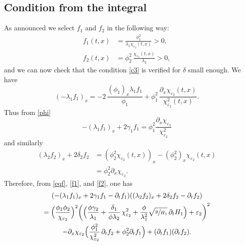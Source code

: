 \documentclass[JEP,XML,SOM,Unicode]{cedram}
\theoremstyle{definition}
\begin{document}
\subsection{Condition from the integral}
{As announced we} select $f_{1}$ and $f_{2}$ in the following way:
\begin{equation}
\begin{split}
f_{1}(t,x)&=\frac{\phi^{2}_{1}}{\lambda_{1}\chi_{\varepsilon_{2}}(t,x)}>0,\\
f_{2}(t,x)&=\phi_{2}^{2}\,\frac{\chi_{\varepsilon_{2}}(t,x)}{\lambda_{2}}>0,
\label{deff1f2}
\end{split}
\end{equation}
and we can now check that the condition \eqref{c3} is verified for $\delta$ small enough. {We have}
\begin{equation*}
(-\lambda_{1}f_{1})_{x}=-2\,\frac{(\phi_{1})_{x}\lambda_{1}f_{1}}{\phi_{1}}+\phi_{1}^{2}\,\frac{\partial_{x}\chi_{\varepsilon_{2}}(t,x)}{\chi_{\varepsilon_{2}}^{2}(t,x)}.
\end{equation*}
Thus from \eqref{phi}
\begin{equation}
-(\lambda_{1}f_{1})_{x}+2\gamma_{1}f_{1}
=\phi_{1}^{2}\frac{\partial_{x}\chi_{\varepsilon_{2}}}{\chi^{2}_{\varepsilon_{2}}}
\label{f1}
\end{equation}
and similarly
\begin{equation}
\begin{split}
(\lambda_{2}f_{2})_{x}+2\delta_{2}f_{2}&=(\phi^{2}_{2}\chi_{\varepsilon_{2}}(t,x))_{x}-(\phi^{2}_{2})_{x}\chi_{\varepsilon_{2}}(t,x)\\
&=\phi_{2}^{2}\partial_{x}\chi_{\varepsilon_{2}}.
\end{split}
\label{f2}
\end{equation}
Therefore, from \eqref{eqf}, \eqref{f1}, and \eqref{f2}, one has
\begin{multline}
\label{cond00}
(-(\lambda_{1}f_{1})_{x}+2\gamma_{1}f_{1}-\partial_{t}f_{1})((\lambda_{2}f_{2})_{x}+2\delta_{2}f_{2}-\partial_{t}f_{2})\\
=\Bigl(\frac{\phi_{1}\phi_{2}}{\chi_{\varepsilon_{2}}} \Bigr)^{2}\biggl(\Bigl(\frac{\phi \gamma_{2}}{\lambda_{1}}+\frac{\delta_{1}}{\phi\lambda_{2}}\,\chi_{\varepsilon_{2}}^{2}+{\frac{\phi}{\lambda_{1}^{2}}}\sqrt{\sfrac{g}{H_{1}}}\,\partial_{t} H_{1} \Bigr)
+\varepsilon_{2} \biggr)^{2}\\
-\partial_{x}\chi_{\varepsilon_{2}} \Bigl(\frac{\phi_{1}^{2}}{\chi^{2}_{\varepsilon_{2}}}\,\partial_{t}f_{2}
+\phi_{2}^{2}\partial_{t}f_{1} \Bigr)
+(\partial_{t}f_{1})(\partial_{t}f_{2}).
\end{multline}
\end{document}
